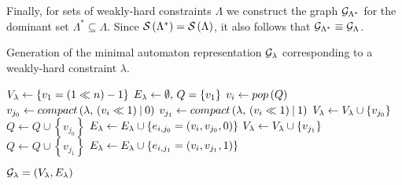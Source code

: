 Finally, for sets of weakly-hard constraints $\Lambda$ we construct the graph $\mathcal{G}_{\Lambda^*}$ for the dominant set $\Lambda^* \subseteq \Lambda$. 
Since $\mathcal{S}_{}\left( \Lambda^* \right) = \mathcal{S}_{}\left( \Lambda \right)$, it also follows that $\mathcal{G}_{\Lambda^*} \equiv \mathcal{G}_{\Lambda}$.

\begin{algorithm}[t]\footnotesize%
    \caption{Generation of the minimal automaton representation $\mathcal{G}_{\lambda}$ corresponding to a weakly-hard constraint $\lambda$.}
    \label{alg:tool:automata} 
    
    \begin{algorithmic}[1]
        \algnewcommand{}
    
            \State $V_{\lambda} \leftarrow \left\{ v_1 = \left( 1 \ll n \right) - 1 \right\}$
            \State $E_{\lambda} \leftarrow \emptyset,\, Q = \left\{ v_1 \right\}$
                \State $v_i \leftarrow pop\left( Q \right)$
                \State $v_{j_0} \leftarrow compact\left( \lambda,\, \left( v_i \ll 1 \right) \mathbin{|} 0 \right)$
                \State $v_{j_1} \leftarrow compact\left( \lambda,\, \left( v_i \ll 1 \right) \mathbin{|} 1 \right)$
                        \State $V_{\lambda} \leftarrow V_{\lambda} \cup \left\{ v_{j_0} \right\}$
                        \State $Q \leftarrow Q \cup \left\{ v_{j_0} \right\}$
                    \EndIf
                    \State $E_{\lambda} \leftarrow E_{\lambda} \cup \left\{ e_{i, j_0} = (v_i, v_{j_0}, 0) \right\}$
                \EndIf
                    \State $V_{\lambda} \leftarrow V_{\lambda} \cup \left\{ v_{j_1} \right\}$
                    \State $Q \leftarrow Q \cup \left\{ v_{j_1} \right\}$
                \EndIf
                \State $E_{\lambda} \leftarrow E_{\lambda} \cup \left\{ e_{i, j_1} = (v_i, v_{j_1}, 1) \right\}$
            \EndWhile
        
            \Return $\mathcal{G}_{\lambda} = \left( V_{\lambda}, E_{\lambda} \right)$
        \EndProcedure
    \end{algorithmic}
\end{algorithm}

